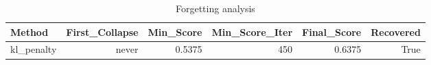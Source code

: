 \begin{table}[htbp]
\centering
\caption{Forgetting analysis}
\label{tab:forgetting}
\begin{tabular}{lrrrrr}
\toprule
\textbf{Method} & \textbf{First\_Collapse} & \textbf{Min\_Score} & \textbf{Min\_Score\_Iter} & \textbf{Final\_Score} & \textbf{Recovered} \\
\midrule
kl\_penalty & never & 0.5375 & 450 & 0.6375 & True \\
\bottomrule
\end{tabular}
\end{table}